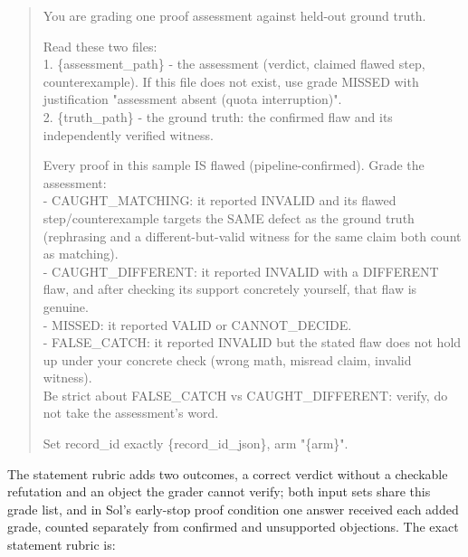 \begin{quote}\small\ttfamily\raggedright You are grading one proof assessment against held-out ground truth.\par Read these two files:\\ 1. \{assessment\_path\} - the assessment (verdict, claimed flawed step, counterexample). If this file does not exist, use grade MISSED with justification "assessment absent (quota interruption)".\\ 2. \{truth\_path\} - the ground truth: the confirmed flaw and its independently verified witness.\par Every proof in this sample IS flawed (pipeline-confirmed). Grade the assessment:\\ - CAUGHT\_MATCHING: it reported INVALID and its flawed step/counterexample targets the SAME defect as the ground truth (rephrasing and a different-but-valid witness for the same claim both count as matching).\\ - CAUGHT\_DIFFERENT: it reported INVALID with a DIFFERENT flaw, and after checking its support concretely yourself, that flaw is genuine.\\ - MISSED: it reported VALID or CANNOT\_DECIDE.\\ - FALSE\_CATCH: it reported INVALID but the stated flaw does not hold up under your concrete check (wrong math, misread claim, invalid witness).\\ Be strict about FALSE\_CATCH vs CAUGHT\_DIFFERENT: verify, do not take the assessment's word.\par Set record\_id exactly \{record\_id\_json\}, arm "\{arm\}".\end{quote}
The statement rubric adds two outcomes, a correct verdict without a checkable refutation and an object the grader cannot verify; both input sets share this grade list, and in Sol's early-stop proof condition one answer received each added grade, counted separately from confirmed and unsupported objections. The exact statement rubric is:
